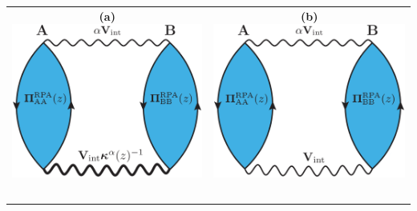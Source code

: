 \documentclass{standalone}
\begin{document}

\begin{tabular}{cc}
  \Huge\bf{(a)} \includegraphics[scale=0.14]{int_gold.eps} 
  & \Huge\bf{(b)} \includegraphics[scale=0.14]{int_gold2.eps} \\
  \
\end{tabular}
\end{document}
